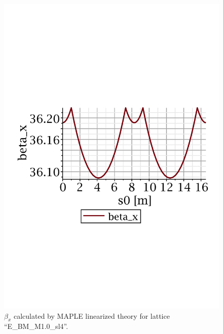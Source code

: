 \documentclass[]{article}
\begin{document}
\begin{figure}[htbp]
\begin{minipage}[b]{0.49\linewidth}
\includegraphics[scale=0.45]{pdf/E_BM_P1p0_2-betax.pdf}
\caption{$\beta_x$ calculated by MAPLE linearized 
theory for lattice ``E\_BM\_M1.0\_sl4''.}
\label{fig:RT_M1.0_betax}
\end{minipage}
\end{figure}
%
%
\end{document}
